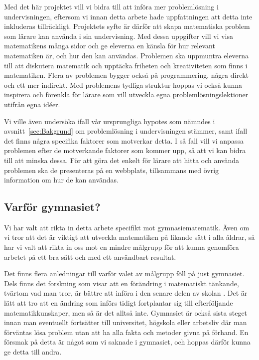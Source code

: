 \textcolor{lila}{Med det här projektet vill vi bidra till att införa mer problemlösning i undervisningen, eftersom vi innan detta arbete hade uppfattningen att detta inte inkluderas tillräckligt. Projektets syfte är därför att skapa matematiska problem som lärare kan använda i sin undervisning. Med dessa uppgifter vill vi visa matematikens många sidor och ge eleverna en känsla för hur relevant matematiken är, och hur den kan användas. Problemen ska uppmuntra eleverna till att diskutera matematik och upptäcka friheten och kreativiteten som finns i matematiken. Flera av problemen bygger också på programmering, några direkt och ett mer indirekt. Med problemens tydliga struktur hoppas vi också kunna inspirera och förenkla för lärare som vill utveckla egna problemlösningslektioner utifrån egna idéer.}

\textcolor{lila}{Vi ville även undersöka ifall vår ursprungliga hypotes som nämndes i avsnitt~\ref{sec:Bakgrund} om problemlösning i undervisningen stämmer, samt ifall det finns några specifika faktorer som motverkar detta. I så fall vill vi anpassa problemen efter de motverkande faktorer som kommer upp, så att vi kan bidra till att minska dessa. För att göra det enkelt för lärare att hitta och använda problemen ska de presenteras på en webbplats, tillsammans med övrig information om hur de kan användas.}


\subsection{Varför gymnasiet?}
\textcolor{lila}{
    Vi har valt att rikta in detta arbete specifikt mot gymnasiematematik. Även om vi tror att det är viktigt att utveckla matematiken på likande sätt i alla åldrar, så har vi valt att rikta in oss mot en mindre målgrupp för att kunna genomföra arbetet på ett bra sätt och med ett användbart resultat. }
    
\textcolor{lila}{
    Det finns flera anledningar till varför valet av målgrupp föll på just gymnasiet. Dels finns det forskning som visar att en förändring i matematiskt tänkande, tvärtom vad man tror, är bättre att införa i den senare delen av skolan \cite{TheElephant}. Det är lätt att tro att en ändring som införs tidigt fortplantar sig till efterföljande matematikkunskaper, men så är det alltså inte. Gymnasiet är också sista steget innan man eventuellt fortsätter till universitet, högskola eller arbetsliv där man förväntas lösa problem utan att ha alla fakta och metoder givna på förhand. En försmak på detta är något som vi saknade i gymnasiet, och hoppas därför kunna ge detta till andra.}
    
